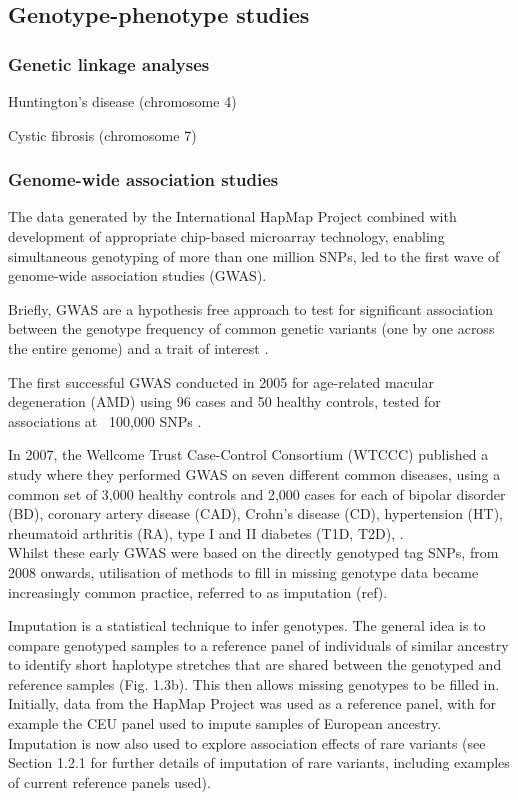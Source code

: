 \subsection{Genotype-phenotype studies}
\subsubsection{Genetic linkage analyses}

Huntington's disease (chromosome 4)

Cystic fibrosis (chromosome 7)

\subsubsection{Genome-wide association studies}

The data generated by the International HapMap Project combined with development of appropriate chip-based microarray technology, enabling simultaneous genotyping of more than one million SNPs, led to the first wave of genome-wide association studies (GWAS).

Briefly, GWAS are a hypothesis free approach to test for significant association between the genotype frequency of common genetic variants (one by one across the entire genome) and a trait of interest \cite{mccarthy2008genome}. 

The first successful GWAS conducted in 2005 for age-related macular degeneration (AMD) using 96 cases and 50 healthy controls, tested for associations at ~100,000 SNPs \cite{klein2005complement}. 

In 2007, the Wellcome Trust Case-Control Consortium (WTCCC) published a study where they performed GWAS on seven different common diseases, using a common set of 3,000 healthy controls and 2,000 cases for each of bipolar disorder (BD), coronary artery disease (CAD), Crohn's disease (CD), hypertension (HT), rheumatoid arthritis (RA), type I and II diabetes (T1D, T2D), \cite{wellcome2007genome}.\\ 

Whilst these early GWAS were based on the directly genotyped tag SNPs, from 2008 onwards, utilisation of methods to fill in missing genotype data became increasingly common practice, referred to as imputation (ref). 

Imputation is a statistical technique to infer genotypes. 
The general idea is to compare genotyped samples to a reference panel of individuals of similar ancestry to identify short haplotype stretches that are shared between the genotyped and reference samples (Fig. 1.3b). This then allows missing genotypes to be filled in.
Initially, data from the HapMap Project was used as a reference panel, with for example the CEU panel used to impute samples of European ancestry. 
Imputation is now also used to explore association effects of rare variants (see Section 1.2.1 for further details of imputation of rare variants, including examples of current reference panels used).

